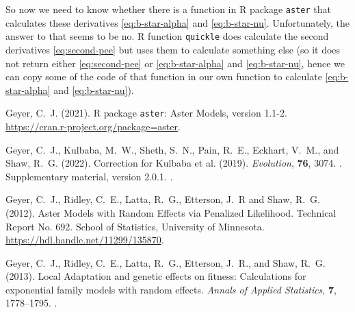 \documentclass[11pt]{article}
\let\code=\texttt
\begin{document}
So now we need to know whether there is a function in R package \code{aster}
that calculates these derivatives
\eqref{eq:b-star-alpha} and \eqref{eq:b-star-nu}.  Unfortunately,
the answer to that seems to be no.
R function \code{quickle} does calculate the second derivatives
\eqref{eq:second-pee} but uses them to calculate something else
(so it does not return either \eqref{eq:second-pee} or
\eqref{eq:b-star-alpha} and \eqref{eq:b-star-nu}, hence we can
copy some of the code of that function in our own function to calculate
\eqref{eq:b-star-alpha} and \eqref{eq:b-star-nu}).

\begin{thebibliography}{}


Geyer, C.~J. (2021).
\newblock R package \texttt{aster}: Aster Models, version 1.1-2.
\newblock \url{https://cran.r-project.org/package=aster}.

Geyer, C.~J., Kulbaba, M.~W., Sheth, S.~N., Pain, R.~E., Eckhart, V.~M.,
    and Shaw, R.~G. (2022).
\newblock Correction for Kulbaba et al. (2019).
\newblock \emph{Evolution}, \textbf{76}, 3074.
\newblock {}.
\newblock Supplementary material, version 2.0.1.
\newblock {}.

Geyer, C.~J., Ridley, C.~E., Latta, R.~G., Etterson, J.~R and Shaw, R.~G.
    (2012).
\newblock Aster Models with Random Effects via Penalized Likelihood.
\newblock Technical Report No. 692.  School of Statistics,
    University of Minnesota.
\newblock \url{https://hdl.handle.net/11299/135870}.

Geyer, C.~J., Ridley, C.~E., Latta, R.~G., Etterson, J.~R., and Shaw, R.~G.
    (2013).
\newblock Local Adaptation and genetic effects on fitness: Calculations for
    exponential family models with random effects.
\newblock \emph{Annals of Applied Statistics}, \textbf{7}, 1778--1795.
\newblock {}.


\end{thebibliography}
\end{document}
